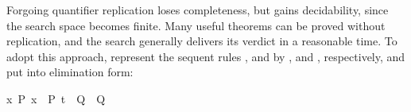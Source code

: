 \begin{isabellebody}
\begin{isamarkuptext}
  Forgoing quantifier replication loses completeness, but gains
  decidability, since the search space becomes finite.  Many useful
  theorems can be proved without replication, and the search generally
  delivers its verdict in a reasonable time.  To adopt this approach,
  represent the sequent rules ,  and
   by ,  and ,
  respectively, and put  into elimination form: \begin{isabelle}%
{}{}x{}\ P\ x\ {}\ {}P\ t\ {}\ Q{}\ {}\ Q{}%
\end{isabelle}


\end{isamarkuptext}
\end{isabellebody}
